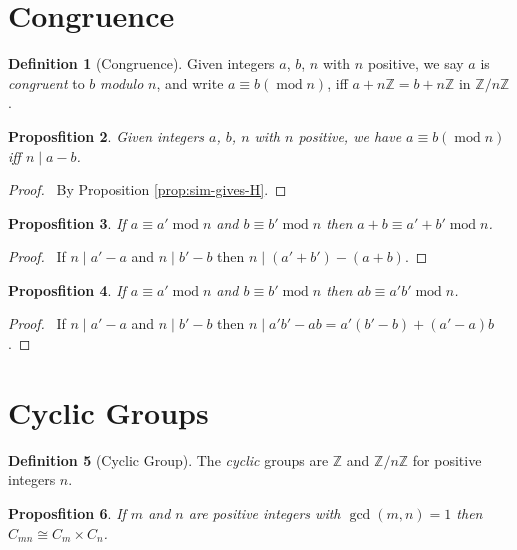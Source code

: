 \documentclass{book}
\let\qed\relax
\newtheorem{prop}{Proposfition}[chapter]
\theoremstyle{definition}
\newtheorem{df}[prop]{Definition}
\renewcommand{\mod}{\ensuremath{\operatorname{mod}}}
\begin{document}
\section{Congruence}

\begin{df}[Congruence]
Given integers $a$, $b$, $n$ with $n$ positive, we say $a$ is \emph{congruent} to $b$ \emph{modulo} $n$, and write $a \equiv b (\mod n)$, iff $a + n \mathbb{Z} = b + n \mathbb{Z}$ in $\mathbb{Z} / n \mathbb{Z}$.
\end{df}

\begin{prop}
Given integers $a$, $b$, $n$ with $n$ positive, we have $a \equiv b (\mod n)$ iff $n \mid a - b$.
\end{prop}

\begin{proof}
\pf\ By Proposition \ref{prop:sim-gives-H}. \qed
\end{proof}

\begin{prop}
    If $a \equiv a' \mod n$ and $b \equiv b' \mod n$ then $a + b \equiv a' + b' \mod n$.
\end{prop}

\begin{proof}
    \pf\ If $n \mid a' - a$ and $n \mid b' - b$ then $n \mid (a' + b') - (a + b)$. \qed
\end{proof}

\begin{prop}
    If $a \equiv a' \mod n$ and $b \equiv b' \mod n$ then $ab \equiv a'b' \mod n$.
\end{prop}

\begin{proof}
    \pf\ If $n \mid a' - a$ and $n \mid b' - b$ then $n \mid a'b' - ab = a'(b'-b) + (a'-a)b$. \qed
\end{proof}

\section{Cyclic Groups}

\begin{df}[Cyclic Group]
    The \emph{cyclic} groups are $\mathbb{Z}$ and $\mathbb{Z} / n \mathbb{Z}$ for positive integers $n$.
\end{df}

\begin{prop}
    If $m$ and $n$ are positive integers with $\gcd(m,n) = 1$ then $C_{mn} \cong C_m \times C_n$.
\end{prop}
\end{document}
